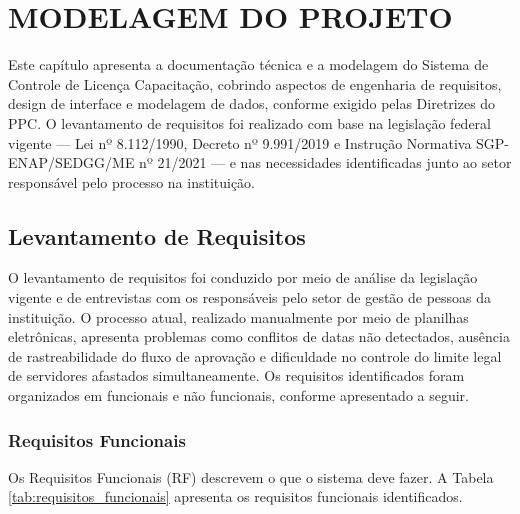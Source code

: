 \chapter{MODELAGEM DO PROJETO}
\label{cap:modelagem}

Este capítulo apresenta a documentação técnica e a modelagem do Sistema de Controle de Licença Capacitação, cobrindo aspectos de engenharia de requisitos, design de interface e modelagem de dados, conforme exigido pelas Diretrizes do PPC. O levantamento de requisitos foi realizado com base na legislação federal vigente — Lei nº 8.112/1990, Decreto nº 9.991/2019 e Instrução Normativa SGP-ENAP/SEDGG/ME nº 21/2021 — e nas necessidades identificadas junto ao setor responsável pelo processo na instituição.

\section{Levantamento de Requisitos}

O levantamento de requisitos foi conduzido por meio de análise da legislação vigente e de entrevistas com os responsáveis pelo setor de gestão de pessoas da instituição. O processo atual, realizado manualmente por meio de planilhas eletrônicas, apresenta problemas como conflitos de datas não detectados, ausência de rastreabilidade do fluxo de aprovação e dificuldade no controle do limite legal de servidores afastados simultaneamente. Os requisitos identificados foram organizados em funcionais e não funcionais, conforme apresentado a seguir.

\subsection{Requisitos Funcionais}
Os Requisitos Funcionais (RF) descrevem o que o sistema deve fazer. A Tabela \ref{tab:requisitos_funcionais} apresenta os requisitos funcionais identificados.


